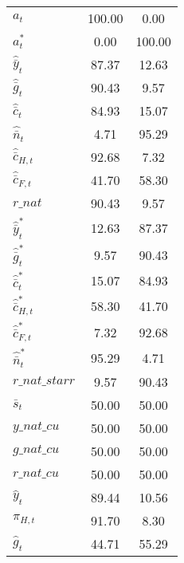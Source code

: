 \begin{center}
\begin{longtable}{lcc}
${a_t}                    $	 & 	            100.00	 & 	              0.00 \\ 
${a_t^*}                  $	 & 	              0.00	 & 	            100.00 \\ 
${\hat {\bar y}_t}        $	 & 	             87.37	 & 	             12.63 \\ 
${\hat {\bar g}_t}        $	 & 	             90.43	 & 	              9.57 \\ 
${\hat {\bar c}_t}        $	 & 	             84.93	 & 	             15.07 \\ 
${\hat {\bar n}_t}        $	 & 	              4.71	 & 	             95.29 \\ 
${\hat {\bar c}_{H,t}}    $	 & 	             92.68	 & 	              7.32 \\ 
${\hat {\bar c}_{F,t}}    $	 & 	             41.70	 & 	             58.30 \\ 
$r\_nat                   $	 & 	             90.43	 & 	              9.57 \\ 
${\hat {\bar y}_t^*}      $	 & 	             12.63	 & 	             87.37 \\ 
${\hat {\bar g}_t^*}      $	 & 	              9.57	 & 	             90.43 \\ 
${\hat {\bar c}_t^*}      $	 & 	             15.07	 & 	             84.93 \\ 
${\hat {\bar c}_{H,t}^*}  $	 & 	             58.30	 & 	             41.70 \\ 
${\hat {\bar c}_{F,t}^*}  $	 & 	              7.32	 & 	             92.68 \\ 
${\hat {\bar n}_t^*}      $	 & 	             95.29	 & 	              4.71 \\ 
$r\_nat\_starr            $	 & 	              9.57	 & 	             90.43 \\ 
${\bar s_t}               $	 & 	             50.00	 & 	             50.00 \\ 
$y\_nat\_cu               $	 & 	             50.00	 & 	             50.00 \\ 
$g\_nat\_cu               $	 & 	             50.00	 & 	             50.00 \\ 
$r\_nat\_cu               $	 & 	             50.00	 & 	             50.00 \\ 
${\hat y_t}               $	 & 	             89.44	 & 	             10.56 \\ 
${\pi_{H,t}}              $	 & 	             91.70	 & 	              8.30 \\ 
${\hat g_t}               $	 & 	             44.71	 & 	             55.29 \\ 

\end{longtable}
\end{center}
